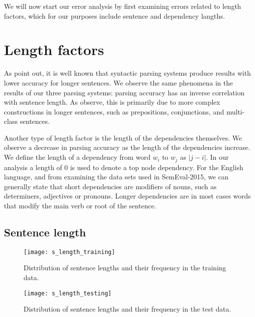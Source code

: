 \vspace{1ex}

We will now start our error analysis by first examining errors related to length factors, which for our purposes include sentence and dependency langths.
    
\section{Length factors}

As  point out, it is well known that syntactic parsing systems produce results with lower accuracy for longer sentences. We observe the same phenomena in the results of our three parsing systems: parsing accuracy has an inverse correlation with sentence length. As  observe, this is primarily due to more complex constructions in longer sentences, such as prepositions, conjunctions, and multi-class sentences.

Another type of length factor is the length of the dependencies themselves. We observe a decrease in parsing accuracy as the length of the dependencies increase. We define the length of a dependency from word $w_i$ to $w_j$ as $|j - i|$. In our analysis a length of $0$ is used to denote a top node dependency. For the English language, and from examining the data sets used in SemEval-2015, we can generally state that short dependencies are modifiers of nouns, such as determiners, adjectives or pronouns. Longer dependencies are in most cases words that modify the main verb or root of the sentence.

\subsection{Sentence length}

\begin{figure}[h]
    \centering
    \begin{minipage}{0.8\textwidth}
        \centering
        \texttt{[image: s\_length\_training]}
    \end{minipage}\hfill
    \caption{Distribution of sentence lengths and their frequency in the training data.}
    \label{fig:sentence_length_1}
\end{figure}

\begin{figure}[h]
    \centering
    \begin{minipage}{0.8\textwidth}
        \centering
        \texttt{[image: s\_length\_testing]}
    \end{minipage}
    \caption{Distribution of sentence lengths and their frequency in the test data.}
    \label{fig:sentence_length_2}
\end{figure}


